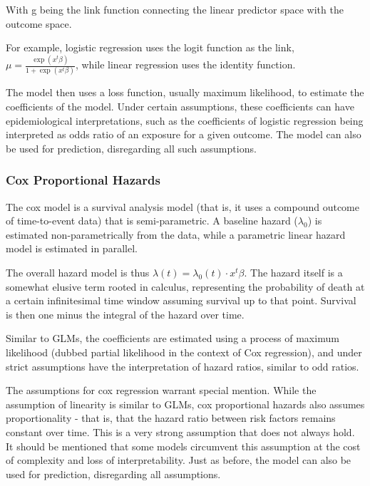 \documentclass[a4paper,12pt]{article}
\begin{document}
			With g being the link function connecting the linear predictor space with the outcome space.
			
			For example, logistic regression uses the logit function as the link, $ \mu = \frac{\exp (x^t \beta)}{1 + \exp (x^t \beta)} $, while linear regression uses the identity function.
			
			The model then uses a loss function, usually maximum likelihood, to estimate the coefficients of the model. Under certain assumptions, these coefficients can have epidemiological interpretations, such as the coefficients of logistic regression being interpreted as odds ratio of an exposure for a given outcome. The model can also be used for prediction, disregarding all such assumptions.
			
			\subsubsection{Cox Proportional Hazards}
			
			The cox model is a survival analysis model (that is, it uses a compound outcome of time-to-event data) that is semi-parametric. A baseline hazard ($ \lambda_0 $) is estimated non-parametrically from the data, while a parametric linear hazard model is estimated in parallel\cite{Cox1972}.
			
			The overall hazard model is thus $ \lambda(t) = \lambda_0(t) \cdot x^t \beta $. The hazard itself is a somewhat elusive term rooted in calculus, representing the probability of death at a certain infinitesimal time window assuming survival up to that point. Survival is then one minus the integral of the hazard over time.
			
			Similar to GLMs, the coefficients are estimated using a process of maximum likelihood (dubbed partial likelihood in the context of Cox regression), and under strict assumptions have the interpretation of hazard ratios, similar to odd ratios.
			
			The assumptions for cox regression warrant special mention. While the assumption of linearity is similar to GLMs, cox proportional hazards also assumes proportionality - that is, that the hazard ratio between risk factors remains constant over time. This is a very strong assumption that does not always hold. It should be mentioned that some models circumvent this assumption at the cost of complexity and loss of interpretability. Just as before, the model can also be used for prediction, disregarding all assumptions.
			
\end{document}
